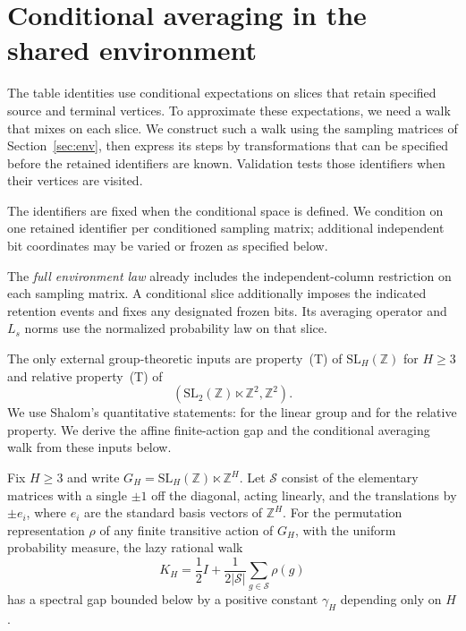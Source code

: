 \section{Conditional averaging in the shared environment}
\label{sec:averaging}

The table identities use conditional expectations on slices that retain
specified source and terminal vertices.  To approximate these expectations,
we need a walk that mixes on each slice.  We construct such a walk using
the sampling matrices of Section~\ref{sec:env}, then express its steps by
transformations that can be specified before the retained identifiers
are known.  Validation tests those identifiers when their vertices are
visited.

The identifiers are fixed when the conditional space is defined.  We
condition on one retained identifier per conditioned sampling matrix; additional
independent bit coordinates may be varied or frozen as specified below.

The \emph{full environment law} already includes the independent-column restriction
on each sampling matrix.  A conditional slice additionally imposes the indicated
retention events and fixes any designated frozen bits.  Its averaging
operator and $L_s$ norms use the normalized probability law on that slice.

The only external group-theoretic inputs are property~(T) of
$\mathrm{SL}_H(\mathbb Z)$ for $H\ge3$ and relative property~(T) of
\[
(\mathrm{SL}_2(\mathbb Z)\ltimes\mathbb Z^2,\mathbb Z^2).
\]
We use Shalom's quantitative statements:
\cite[Theorem~2.6, p.~156]{Shalom1999} for the linear group and
\cite[Theorem~2.1, p.~152]{Shalom1999} for the relative property.
We derive the affine finite-action gap and the conditional averaging walk from
these inputs below.

\begin{lemma}\label{lem:env-affine}
Fix $H\ge3$ and write $G_H=\mathrm{SL}_H(\mathbb Z)\ltimes\mathbb Z^H$.
Let $\mathcal S$ consist of the elementary matrices with a single
$\pm1$ off the diagonal, acting linearly, and the translations by
$\pm e_i$, where $e_i$ are the standard basis vectors of $\mathbb Z^H$.
For the permutation representation $\rho$ of any finite transitive
action of $G_H$, with the uniform probability measure, the lazy
rational walk
\[
K_H=\frac12I+\frac1{2|\mathcal S|}\sum_{g\in\mathcal S}\rho(g)
\]
has a spectral gap bounded below by a positive constant $\gamma_H$
depending only on $H$.
\end{lemma}

